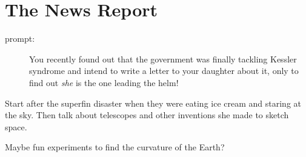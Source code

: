 \section*{The News Report}

\begin{description}
\item[prompt:] You recently found out that the government was finally tackling Kessler syndrome and intend to write a letter to your daughter about it, only to find out \textit{she} is the one leading the helm!
\end{description}

Start after the superfin disaster when they were eating ice cream and staring at the sky.
Then talk about telescopes and other inventions she made to sketch space.

Maybe fun experiments to find the curvature of the Earth?
